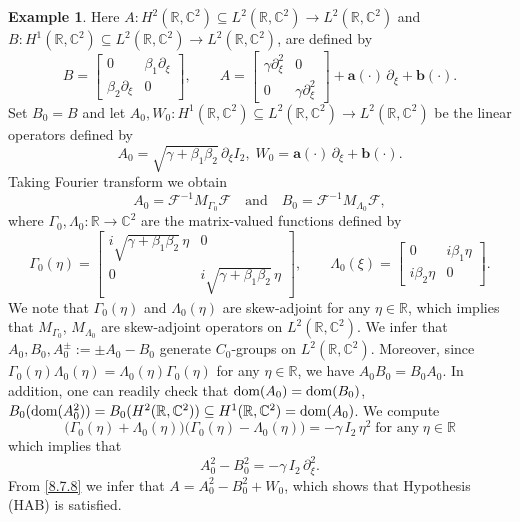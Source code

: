 \documentclass[11pt]{amsart}
\numberwithin{equation}{section}
\newcommand\R{\mathbb R}
\newcommand\C{\mathbb C}
\newcommand{\RR}{{\mathbb R}}
\theoremstyle{remark}
\theoremstyle{definition}
\newtheorem{example}[theorem]{Example}
\newcommand{\dom}{\text{\rm{dom}}}
\begin{document}
\begin{example}
	Here $A: H^2(\R,\C^2) \subseteq L^2(\R,\C^2) \to L^2(\R,\C^2)$ and $B: H^1(\R,\C^2) \subseteq L^2(\R,\C^2) \to L^2(\R,\C^2)$,
	are defined by
	\begin{equation}\label{8.7.2}
		B = \begin{bmatrix}0 & \beta_1\partial_\xi\\\beta_2\partial_\xi & 0\end{bmatrix},\qquad
		A = \begin{bmatrix}\gamma\partial_\xi^2 & 0\\ 0 & \gamma\partial_\xi^2\end{bmatrix}
		+ \mathbf{a}(\cdot)\,\partial_\xi + \mathbf{b}(\cdot).
	\end{equation}
	Set $B_0=B$ and let $A_0, W_0: H^1(\R,\C^2) \subseteq L^2(\R,\C^2) \to L^2(\R,\C^2)$ be the linear operators defined by
	\begin{equation}\label{8.7.3}
		A_0 = \sqrt{\gamma+\beta_1\beta_2}\,\partial_\xi I_2,\;
		W_0 = \mathbf{a}(\cdot)\,\partial_\xi+ \mathbf{b}(\cdot).
	\end{equation}
	Taking Fourier transform we obtain 
	\begin{equation}\label{8.7.4}
		A_0 = \mathcal{F}^{-1} M_{\Gamma_0} \mathcal{F}\quad\text{and}\quad
		B_0 = \mathcal{F}^{-1} M_{\Lambda_0} \mathcal{F},
	\end{equation}
	where $\Gamma_0, \Lambda_0: \R \to \C^2$ are the matrix-valued functions defined by
	\begin{equation}\label{8.7.5}
		\Gamma_0(\eta) = \begin{bmatrix}i\sqrt{\gamma+\beta_1\beta_2}\,\eta & 0\\ 0 & i\sqrt{\gamma+\beta_1\beta_2}\,\eta\end{bmatrix},\qquad
		\Lambda_0(\xi) = \begin{bmatrix}0 & i\beta_1\eta\\ i\beta_2\eta & 0\end{bmatrix}.
	\end{equation}
	We note that $\Gamma_0(\eta)$ and $\Lambda_0(\eta)$ are skew-adjoint for any $\eta\in\R$,
	which implies that $M_{\Gamma_0}$, $M_{\Lambda_0}$ are skew-adjoint operators on
	$L^2(\R,\C^2)$. We infer that $A_0, B_0, A_0^\pm := \pm A_0 - B_0$ generate
	$C_0$-groups on $L^2(\R,\C^2)$. Moreover, since
	$\Gamma_0(\eta)\Lambda_0(\eta) = \Lambda_0(\eta)\Gamma_0(\eta)$ for any $\eta\in\R$,
	we have $A_0 B_0 = B_0 A_0$.
	In addition, one can readily check that $\dom(A_0) = \dom(B_0)$,
	$B_0(\dom(A_0^2)) = B_0(H^2(\R,\C^2)) \subseteq H^1(\R,\C^2) = \dom(A_0)$.
	We compute
	\begin{equation}\label{8.7.6}
		\bigl(\Gamma_0(\eta) + \Lambda_0(\eta)\bigr)\bigl(\Gamma_0(\eta) - \Lambda_0(\eta)\bigr)
		= -\gamma\,I_2\,\eta^2\;\mbox{for any}\;\eta\in\RR
	\end{equation}
	which implies that
	\begin{equation}\label{8.7.8}
		A_0^2-B_0^2 = -\gamma\,I_2\,\partial_\xi^2.
	\end{equation}
	From \eqref{8.7.8} we infer that $A = A_0^2-B_0^2+ W_0$, which shows that Hypothesis (HAB)
	is satisfied.
\end{example}
\end{document}
